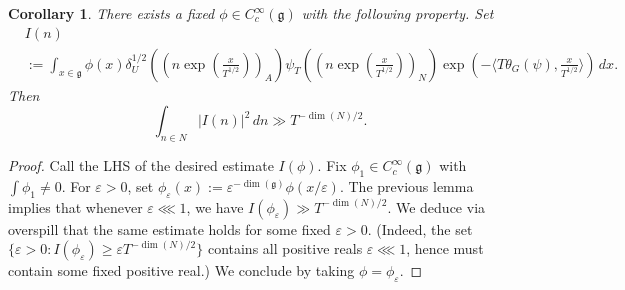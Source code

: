 \documentclass[reqno]{amsart}
\def\eps{\varepsilon}
\theoremstyle{plain} \newtheorem{theorem} {Theorem}
\newtheorem{corollary} [theorem] {Corollary}
\theoremstyle{definition} \newtheorem{definition} [theorem] {Definition}
\theoremstyle{itplain} %
\numberwithin{equation}{section}
\numberwithin{theorem}{section}
\renewcommand{\geq}{\geqslant}
\begin{document}
\begin{corollary}\label{cor:sub-gln:there-exists-fixed}
  There exists a fixed $\phi \in C_c^\infty(\mathfrak{g})$ with the following property.  Set
  \begin{align*}
    &I(n) \\
    &:=
      \int _{x \in \mathfrak{g}}
      \phi(x) \delta_U^{1/2} \left( (n \exp(\tfrac{x}{T^{1/2}}))_A  \right)
      \psi_T ( (n \exp(\tfrac{x}{T^{1/2}}))_N )
      \exp (- \langle T \theta_G(\psi), \tfrac{x}{T^{1/2}} \rangle) \, d x.
  \end{align*}
  Then
  \begin{equation*}
    \int _{n \in N}
    \left\lvert
      I(n)
    \right\rvert^2
    \, d n
    \gg T^{-\dim(N)/2}.
  \end{equation*}
\end{corollary}
\begin{proof}
  Call the LHS of the desired estimate $I(\phi)$.  Fix $\phi_1 \in C_c^\infty(\mathfrak{g})$ with $\int \phi_1 \neq 0$.  For $\eps> 0$, set $\phi_\eps(x) := \eps^{-\dim(\mathfrak{g})} \phi(x/\eps)$.  The previous lemma implies that whenever $\eps \lll 1$, we have $I(\phi_\eps) \gg T^{-\dim(N)/2}$.  We deduce via overspill that the same estimate holds for some fixed $\eps > 0$.  (Indeed, the set $\{\eps > 0 : I(\phi_{\eps}) \geq \eps T^{-\dim(N)/2} \}$ contains all positive reals $\eps \lll 1$, hence must contain some fixed positive real.)  We conclude by taking $\phi = \phi_\eps$.
\end{proof}
\end{document}
